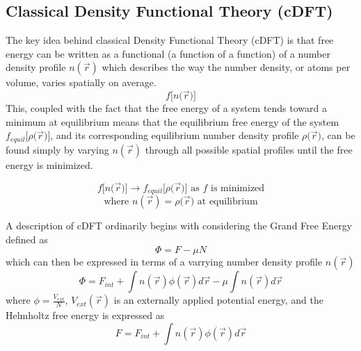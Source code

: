 \documentclass[double,12pt]{beavtex}
\begin{document}
\subsection{Classical Density Functional Theory (cDFT)}

The key idea behind classical Density Functional Theory (cDFT) is that free energy can be written as a functional (a function of a function) of a number density profile $n(\vec{r})$ which describes the way the number density, or atoms per volume, varies spatially on average. 
\begin{displaymath}{f[n(}\vec{r}{)]}\end{displaymath}
This, coupled with the fact that the free energy of a system tends toward a minimum at equilibrium means that the equilibrium free energy of the system ${f_{equil}}{[}\rho{(}\vec{r}{)]}$, and its corresponding equilibrium number density profile $\rho{(}\vec{r}{)}$, can be found simply by varying $n(\vec{r})$ through all possible spatial profiles until the free energy is minimized. 

\begin{displaymath}{f[n(}\vec{r}{)]}\rightarrow{f_{equil}}{[}\rho{(}\vec{r}{)]}  \mbox{ as $f$ is minimized} \end{displaymath}
\begin{displaymath}{\mbox{where }  n(\vec{r})=\rho{(}\vec{r})  \mbox{ at equilibrium}}\end{displaymath}


A description of cDFT ordinarily begins with considering the Grand Free Energy defined as
\begin{equation}\Phi=F-\mu{N}\end{equation}
which can then be expressed in terms of a varrying number density profile $n(\vec r)$
\begin{equation}\label{GrandFE}\Phi= F_{int} +\int n(\vec{r})\phi{(\vec r)}d\vec{r}-\mu\int n(\vec r)d\vec{r}\end{equation}
where $\phi=\frac{V_{ext}}{N}$, $V_{ext}(\vec r)$ is an externally applied potential energy, and the Helmholtz free energy is expressed as
\begin{equation}F = F_{int} + \int n(\vec{r})\phi{(\vec r)}d\vec{r}\end{equation}  
\end{document}
